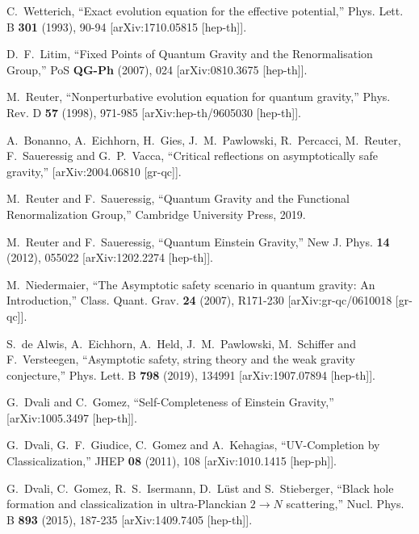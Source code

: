 \documentclass[12pt]{article}
\numberwithin{equation}{section}
\begin{document}
\begin{thebibliography}{999}
C.~Wetterich,
``Exact evolution equation for the effective potential,''
Phys. Lett. B \textbf{301} (1993), 90-94
[arXiv:1710.05815 [hep-th]].

D.~F.~Litim,
``Fixed Points of Quantum Gravity and the Renormalisation Group,''
PoS \textbf{QG-Ph} (2007), 024
[arXiv:0810.3675 [hep-th]].

M.~Reuter,
``Nonperturbative evolution equation for quantum gravity,''
Phys. Rev. D \textbf{57} (1998), 971-985
[arXiv:hep-th/9605030 [hep-th]].

A.~Bonanno, A.~Eichhorn, H.~Gies, J.~M.~Pawlowski, R.~Percacci, M.~Reuter, F.~Saueressig and G.~P.~Vacca,
``Critical reflections on asymptotically safe gravity,'' [arXiv:2004.06810 [gr-qc]].

M.~Reuter and F.~Saueressig,
``Quantum Gravity and the Functional Renormalization Group,'' Cambridge University Press, 2019.



M.~Reuter and F.~Saueressig,
``Quantum Einstein Gravity,''
New J. Phys. \textbf{14} (2012), 055022
[arXiv:1202.2274 [hep-th]].

M.~Niedermaier,
``The Asymptotic safety scenario in quantum gravity: An Introduction,''
Class. Quant. Grav. \textbf{24} (2007), R171-230
[arXiv:gr-qc/0610018 [gr-qc]].

S.~de Alwis, A.~Eichhorn, A.~Held, J.~M.~Pawlowski, M.~Schiffer and F.~Versteegen,
``Asymptotic safety, string theory and the weak gravity conjecture,''
Phys. Lett. B \textbf{798} (2019), 134991
[arXiv:1907.07894 [hep-th]].

G.~Dvali and C.~Gomez,
``Self-Completeness of Einstein Gravity,''
[arXiv:1005.3497 [hep-th]].

G.~Dvali, G.~F.~Giudice, C.~Gomez and A.~Kehagias,
``UV-Completion by Classicalization,''
JHEP \textbf{08} (2011), 108
[arXiv:1010.1415 [hep-ph]].

G.~Dvali, C.~Gomez, R.~S.~Isermann, D.~L\"ust and S.~Stieberger,
``Black hole formation and classicalization in ultra-Planckian $2\to N$ scattering,''
Nucl. Phys. B \textbf{893} (2015), 187-235
[arXiv:1409.7405 [hep-th]].


\end{thebibliography}
\end{document}
